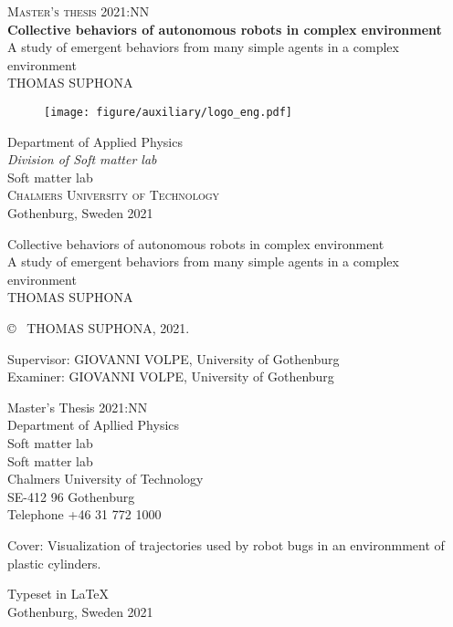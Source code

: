 \newpage
\thispagestyle{empty}
\begin{center}
	\textsc{\large Master's thesis 2021:NN}\\[4cm]		%
	\textbf{\Large Collective behaviors of autonomous robots in complex environment} \\[1cm]
	{\large A study of emergent behaviors from many simple agents in a complex environment}\\[1cm]
	{\large THOMAS SUPHONA}
	
	\vfill	
	\begin{figure}[H]
	\centering
	\texttt{[image: figure/auxiliary/logo\_eng.pdf]} \\	
	\end{figure}	\vspace{5mm}	
	
	Department of Applied Physics \\
	\emph{Division of Soft matter lab}\\
	Soft matter lab\\
	\textsc{Chalmers University of Technology} \\
	Gothenburg, Sweden 2021 \\
\end{center}


\newpage
\thispagestyle{plain}
\vspace*{4.5cm}
Collective behaviors of autonomous robots in complex environment\\
A study of emergent behaviors from many simple agents in a complex environment\\
THOMAS SUPHONA \setlength{\parskip}{1cm}

\copyright ~ THOMAS SUPHONA, 2021. \setlength{\parskip}{1cm}

Supervisor: GIOVANNI VOLPE, University of Gothenburg\\
Examiner: GIOVANNI VOLPE, University of Gothenburg \setlength{\parskip}{1cm}

Master's Thesis 2021:NN\\	%
Department of Apllied Physics\\
Soft matter lab\\
Soft matter lab\\
Chalmers University of Technology\\
SE-412 96 Gothenburg\\
Telephone +46 31 772 1000 \setlength{\parskip}{0.5cm}

\vfill
Cover: Visualization of trajectories used by robot bugs in an environmment of plastic cylinders.\setlength{\parskip}{0.5cm}

Typeset in \LaTeX \\
Gothenburg, Sweden 2021

